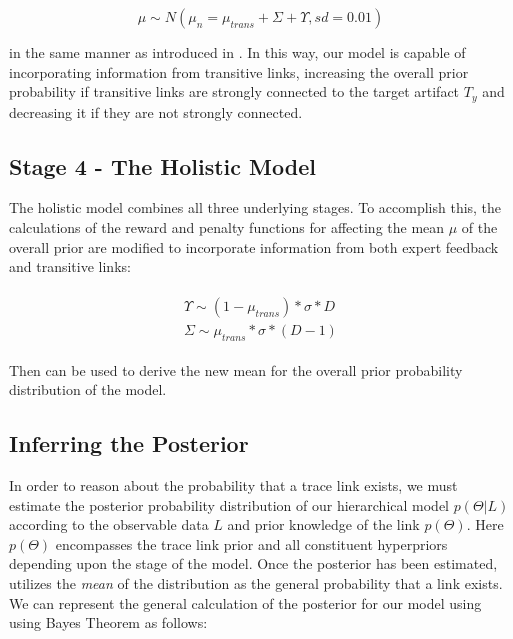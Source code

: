 \begin{equation}\label{eq:mean-affect-combined}
	\mu \sim N(\mu_n= \mu_{trans} + \Sigma + \Upsilon, sd=0.01)
\end{equation}

\noindent in the same manner as introduced in . In this way, our model is capable of incorporating information from transitive links, increasing the overall prior probability if transitive links are strongly connected to the target artifact $T_y$ and decreasing it if they are not strongly connected.

\subsection{Stage 4 - The Holistic Model}
\label{sub:model-comp4}

The holistic model combines all three underlying stages. To accomplish this, the calculations of the reward and penalty functions for affecting the mean $\mu$ of the overall prior are modified to incorporate information from both expert feedback and transitive links:

\begin{align}
\begin{split}
	\Upsilon \sim (1-\mu_{trans})*\sigma*D \\
	\Sigma \sim \mu_{trans}*\sigma*(D-1)
\end{split}
\end{align}

\noindent Then  can be used to derive the new mean for the overall prior probability distribution of the model.

\subsection{Inferring the Posterior}
\label{sub:model-posterior}

In order to reason about the probability that a trace link exists, we must estimate the posterior probability distribution of our hierarchical model $p(\Theta|L)$ according to the observable data $L$ and prior knowledge of the link $p(\Theta)$. Here $p(\Theta)$ encompasses the trace link prior and all constituent hyperpriors depending upon the stage of the model.  Once the posterior has been estimated, \Comet utilizes the \textit{mean} of the distribution as the general probability that a link exists. We can represent the general calculation of the posterior for our model using using Bayes Theorem as follows:  

